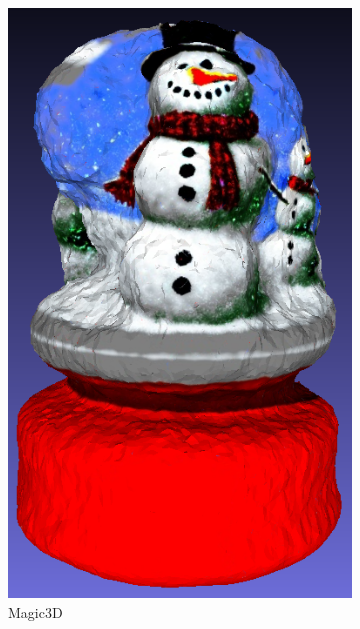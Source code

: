 \begin{figure}[ht]
\begin{subfigure}[b]{0.17\textwidth}
        \includegraphics[width=\textwidth]{figures/subjective/magic3d_globe_result.png}
        \caption{Magic3D}
        \vspace{0.1cm}
    \end{subfigure}
    \begin{subfigure}[b]{0.241\textwidth}
        \centering

\end{subfigure}
\end{figure}
